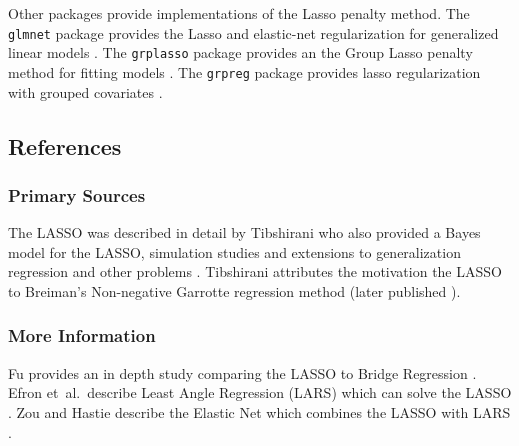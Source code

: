 Other packages provide implementations of the Lasso penalty method.
The \texttt{glmnet} package provides the Lasso and elastic-net regularization for generalized linear models \cite{Friedman2011}.
The \texttt{grplasso} package provides an the Group Lasso penalty method for fitting models \cite{Meier2009}.
The \texttt{grpreg} package provides lasso regularization with grouped covariates \cite{Brehen2011}.


\subsection{References}

\subsubsection{Primary Sources}
The LASSO was described in detail by Tibshirani who also provided a Bayes model for the LASSO, simulation studies and extensions to generalization regression and other problems \cite{Tibshirani1996}. Tibshirani attributes the motivation the LASSO to Breiman's Non-negative Garrotte regression method \cite{Breiman1993} (later published \cite{Breiman1995}).

\subsubsection{More Information}
Fu provides an in depth study comparing the LASSO to Bridge Regression \cite{Fu1998}.
Efron et~al.\ describe Least Angle Regression (LARS) which can solve the LASSO \cite{Efron2002}.
Zou and Hastie describe the Elastic Net which combines the LASSO with LARS \cite{Zou2005}.

